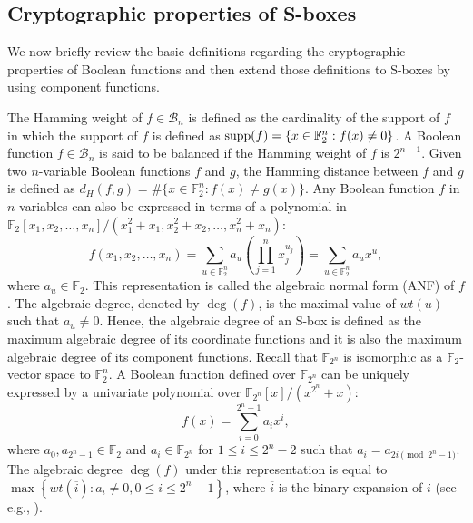 \documentclass[12 pt]{article}
\def\F{{\mathbb F}}
\begin{document}
\subsection{Cryptographic properties of S-boxes}
  We now briefly review the basic definitions regarding the cryptographic properties of Boolean functions and then extend those definitions to S-boxes by using component functions. 

  The Hamming weight of $f\in\mathcal B_n$ is defined as the cardinality of the support of $f$ in which the support of $f$ is defined as ${\rm supp}(f)=\{x\in\F_2^n:f(x)\ne 0\}$.  
  A Boolean function $f\in\mathcal{B}_n$ is said to be balanced if the Hamming weight of $f$ is $2^{n-1}$. 
  Given two $n$-variable Boolean functions $f$ and $g$, the Hamming distance between $f$ and $g$ is defined as $d_H(f,g)=\#\{x\in\F_2^n:f(x)\ne g(x)\}$. 
  Any Boolean function $f$ in $n$ variables can also be expressed in terms of a polynomial in $\F_2[x_1,x_2,\ldots,x_n]/(x_1^2+x_1,x_2^2+x_2,\ldots,x_n^2+ x_n)$:
  \begin{equation*}\label{D:ANF}
    f(x_1,x_2,\ldots,x_n)=\sum_{u\in\F_2^n}a_u\left( \prod_{j=1}^n x_j^{u_j} \right)=\sum_{u\in\F_2^n}a_u x^u,
  \end{equation*}
  where $a_u\in\F_2$. 
  This representation is called the algebraic normal form (ANF) of $f$. 
  The algebraic degree, denoted by $\deg(f)$, is the maximal value of $wt(u)$ such that $a_u\ne 0$. 
  Hence, the algebraic degree of an S-box is defined as the maximum algebraic degree of its coordinate functions and it is also the maximum algebraic degree of its component functions. 
  Recall that $\F_{2^n}$ is isomorphic as a $\F_2$-vector space to $\F_2^n$.  
  A Boolean function defined over $\F_{2^n}$ can be uniquely expressed by a univariate polynomial over $\F_{2^n}[x]/(x^{2^n}+x)$:
  \begin{equation*}\label{Ploynoimal}
    f(x) =\sum_{i=0}^{2^n-1} a_i x^i,
  \end{equation*}
  where $a_0,a_{2^n-1}\in\F_2$ and $a_{i}\in\F_{2^n}$ for $1\le i\le 2^n-2$ such that $a_i=a_{2i\pmod{2^n-1}}$. 
  The algebraic degree $\deg(f)$ under this representation is equal to $\max\left\{ wt(\overline{i}):a_i\ne 0, 0\le i\le 2^n-1 \right\}$, where $\overline{i}$ is the binary expansion of $i$ (see e.g., \cite{Carlet10}). 
  
\end{document}
